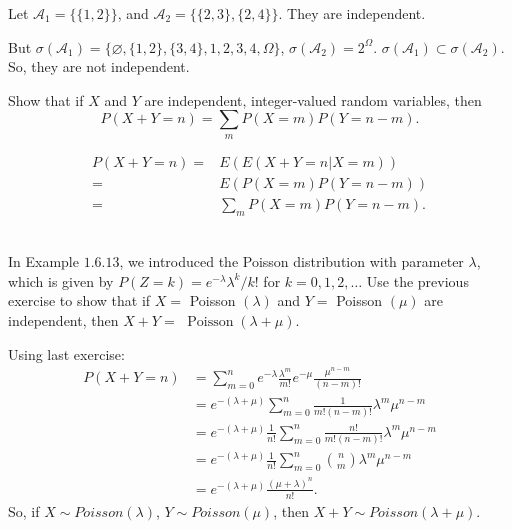 \documentclass[en, normal, 11pt, black]{elegantnote}
\newenvironment{exercise}[1]{\begin{tcolorbox}[colback=black!15, colframe=black!80, breakable, title=#1]}{\end{tcolorbox}}
\renewenvironment{proof}{\begin{tcolorbox}[colback=white, colframe=black!50, breakable, title=Proof. ]\setlength{\parskip}{0.8em}}{\,\\\rightline{$\square$}\end{tcolorbox}}
\begin{document}
    \begin{proof}
        Let $\mathcal{A}_1=\{\{1,2\}\}$, and $\mathcal{A}_2=\{\{2,3\},\{2,4\}\}$. They are independent. 
        
        But $\sigma(\mathcal{A}_1)=\{\varnothing, \{1,2\},\{3,4\}, {1,2,3,4}, \Omega\}$, $\sigma(\mathcal{A}_2)=2^\Omega$. $\sigma(\mathcal{A}_1)\subset\sigma(\mathcal{A}_2)$. So, they are not independent. 
    \end{proof}

    \begin{exercise}{2.1.10}
        Show that if $X$ and $Y$ are independent, integer-valued random variables, then
        \[
            P(X+Y=n)=\sum_{m} P(X=m) P(Y=n-m). 
        \]
    \end{exercise}

    \begin{proof}
        \[
            \begin{aligned}
                P(X+Y=n)=&E\left(E(X+Y=n|X=m)\right)\\
                =&E(P(X=m)P(Y=n-m))\\
                =&\sum_mP(X=m)P(Y=n-m). 
            \end{aligned}
        \]
        \vspace*{-30pt}
    \end{proof}

    \begin{exercise}{2.1.11}
        In Example $1.6 .13$, we introduced the Poisson distribution with parameter $\lambda$, which is given by $P(Z=k)=e^{-\lambda} \lambda^{k} / k !$ for $k=0,1,2, \ldots$ Use the previous exercise to show that if $X=$ Poisson $(\lambda)$ and $Y=$ Poisson $(\mu)$ are independent, then $X+Y=$ $\operatorname{Poisson}(\lambda+\mu)$. 
    \end{exercise}

    \begin{proof}
        Using last exercise: 
        \[
            \begin{aligned}
                P(X+Y=n) &=\sum_{m=0}^{n} e^{-\lambda} \frac{\lambda^{m}}{m !} e^{-\mu} \frac{\mu^{n-m}}{(n-m) !} \\
                &=e^{-(\lambda+\mu)} \sum_{m=0}^{n} \frac{1}{m !(n-m) !} \lambda^{m} \mu^{n-m} \\
                &=e^{-(\lambda+\mu)} \frac{1}{n !} \sum_{m=0}^{n} \frac{n !}{m !(n-m) !} \lambda^{m} \mu^{n-m} \\
                &=e^{-(\lambda+\mu)} \frac{1}{n !} \sum_{m=0}^{n} \binom{n}{m} \lambda^{m} \mu^{n-m} \\
                &=e^{-(\lambda+\mu)} \frac{(\mu+\lambda)^{n}}{n !}. 
            \end{aligned}
        \]
        So, if $X\sim Poisson(\lambda)$, $Y\sim Poisson(\mu)$, then $X+Y\sim Poisson(\lambda+\mu)$. 
    \end{proof}
\end{document}
